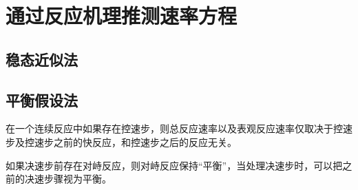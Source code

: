 \section{通过反应机理推测速率方程}

\subsection{稳态近似法}

\subsection{平衡假设法}

在一个连续反应中如果存在控速步，则总反应速率以及表观反应速率仅取决于控速步及控速步之前的快反应，和控速步之后的反应无关。

如果决速步前存在对峙反应，则对峙反应保持``平衡''，当处理决速步时，可以把之前的决速步骤视为平衡。